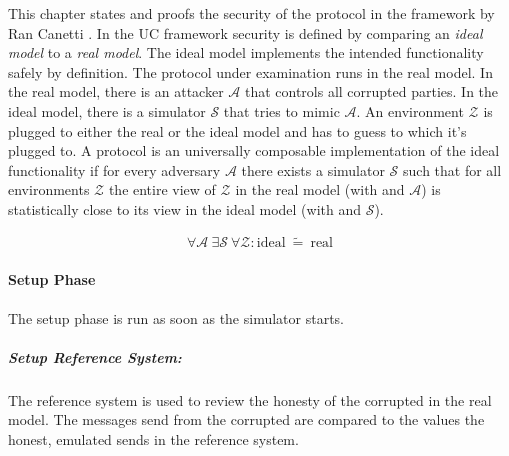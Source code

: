 \label{sec:security}

This chapter states and proofs the security of the protocol in the
 framework by Ran Canetti \cite{canetti05}.
In the UC framework security is defined by comparing an \emph{ideal model} to a
\emph{real model}. The ideal model implements the intended functionality
\JWfuncSym{}{} safely by definition. The protocol under examination runs in the
real model. In the real model, there is an attacker $\mathcal{A}$ that controls
all corrupted parties.  In the ideal model, there is a simulator $\mathcal{S}$
that tries to mimic $\mathcal{A}$. An environment $\mathcal{Z}$ is plugged to
either the real or the ideal model and has to guess to which it's plugged to. A
protocol \JWprotoSym{}{} is an universally composable implementation of the
ideal functionality if for every adversary $\mathcal{A}$ there exists a
simulator $\mathcal{S}$ such that for all environments $\mathcal{Z}$ the entire
view of $\mathcal{Z}$ in the real model (with \JWprotoSym{}{} and $\mathcal{A}$)
is statistically close to its view in the ideal model (with \JWfuncSym{}{} and
$\mathcal{S}$).

\begin{align*}
%
\forall \mathcal{A}\ \exists \mathcal{S}\ \forall \mathcal{Z} :
\text{ideal}\ \widetilde{=}\ \text{real}
%
\end{align*}

%
%
\label{sec:simulators}


\label{sec:simulator-david}

\paragraph{Setup Phase}

The setup phase is run as soon as the simulator starts.


\subparagraph{Setup Reference System:}

The reference system is used to review the honesty of the corrupted \JWpTwo{} in
the real model. The messages send from the corrupted \JWpTwo{} are compared
to the values the honest, emulated \JWpTwo{} sends in the reference system.

